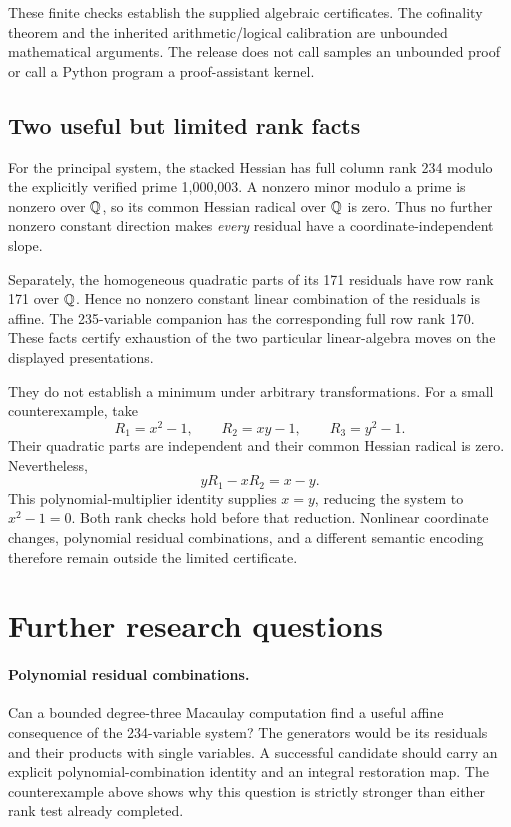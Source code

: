 \documentclass[10pt,letterpaper]{article}
\theoremstyle{definition}\newtheorem{remark}[theorem]{Remark}
\begin{document}
These finite checks establish the supplied algebraic certificates. The
cofinality theorem and the inherited arithmetic/logical calibration are
unbounded mathematical arguments. The release does not call samples an
unbounded proof or call a Python program a proof-assistant kernel.

\subsection{Two useful but limited rank facts}

For the principal system, the stacked Hessian has full column rank 234
modulo the explicitly verified prime 1,000,003. A nonzero minor modulo a
prime is nonzero over $\mathbb Q$, so its common Hessian radical over $\mathbb Q$ is
zero. Thus no further nonzero constant direction makes \emph{every}
residual have a coordinate-independent slope.

Separately, the homogeneous quadratic parts of its 171 residuals have
row rank 171 over $\mathbb Q$. Hence no nonzero constant linear combination of
the residuals is affine. The 235-variable companion has the corresponding
full row rank 170. These facts certify exhaustion of the two particular
linear-algebra moves on the displayed presentations.

They do not establish a minimum under arbitrary transformations. For a
small counterexample, take
\[
 R_1=x^2-1,\qquad R_2=xy-1,\qquad R_3=y^2-1.
\]
Their quadratic parts are independent and their common Hessian radical
is zero. Nevertheless,
\[
 yR_1-xR_2=x-y.
\]
This polynomial-multiplier identity supplies $x=y$, reducing the system
to $x^2-1=0$. Both rank checks hold before that reduction. Nonlinear
coordinate changes, polynomial residual combinations, and a different
semantic encoding therefore remain outside the limited certificate.

\section{Further research questions}

\paragraph{Polynomial residual combinations.}
Can a bounded degree-three Macaulay computation find a useful affine
consequence of the 234-variable system? The generators would be its
residuals and their products with single variables. A successful candidate
should carry an explicit polynomial-combination identity and an integral
restoration map. The counterexample above shows why this question is
strictly stronger than either rank test already completed.
\end{document}
